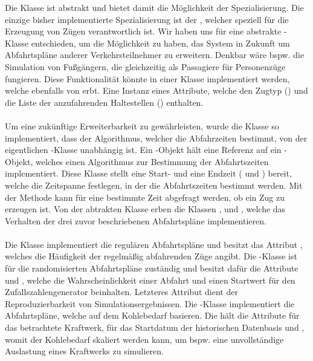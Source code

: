 Die Klasse  ist abstrakt und bietet damit die Möglichkeit der Spezialisierung. Die einzige bisher implementierte Spezialisierung ist der , welcher speziell für die Erzeugung von Zügen verantwortlich ist. Wir haben uns für eine abstrakte -Klasse entschieden, um die Möglichkeit zu haben, das System in Zukunft um Abfahrtspläne anderer Verkehrsteilnehmer zu erweitern. Denkbar wäre bspw. die Simulation von Fußgängern, die gleichzeitig als Passagiere für Personenzüge fungieren. Diese Funktionalität könnte in einer Klasse  implementiert werden, welche ebenfalls von  erbt. Eine Instanz eines  Attribute, welche den Zugtyp () und die Liste der anzufahrenden Haltestellen () enthalten.\\
\\
Um eine zukünftige Erweiterbarkeit zu gewährleisten, wurde die Klasse  so implementiert, dass der Algorithmus, welcher die Abfahrzeiten bestimmt, von der eigentlichen -Klasse unabhängig ist. Ein -Objekt hält eine Referenz auf ein -Objekt, welches einen Algorithmus zur Bestimmung der Abfahrtszeiten implementiert. Diese Klasse stellt eine Start- und eine Endzeit ( und ) bereit, welche die Zeitspanne festlegen, in der die Abfahrtszeiten bestimmt werden. Mit der Methode  kann für eine bestimmte Zeit abgefragt werden, ob ein Zug zu erzeugen ist. Von der abtrakten Klasse  erben die Klassen ,  und , welche das Verhalten der drei zuvor beschriebenen Abfahrtspläne implementieren.\\
\\
Die Klasse  implementiert die regulären Abfahrtspläne und besitzt das Attribut , welches die Häufigkeit der regelmäßig abfahrenden Züge angibt. Die -Klasse ist für die randomisierten Abfahrtspläne zuständig und besitzt dafür die Attribute  und , welche die Wahrscheinlichkeit einer Abfahrt und einen Startwert für den Zufallszahlengenerator beinhalten. Letzteres Attribut dient der Reproduzierbarkeit von Simulationsergebnissen. Die -Klasse implementiert die Abfahrtspläne, welche auf dem Kohlebedarf basieren. Die hält die Attribute  für das betrachtete Kraftwerk,  für das Startdatum der historischen Datenbasis und , womit der Kohlebedarf skaliert werden kann, um bspw. eine unvollständige Auslastung eines Kraftwerks zu simulieren.

